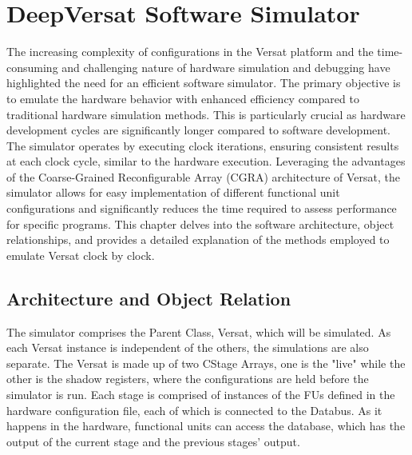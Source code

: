 \chapter{DeepVersat Software Simulator}
\label{chapter:Simulator}

The increasing complexity of configurations in the Versat platform and the time-consuming and challenging nature of hardware simulation and debugging have highlighted the need for an efficient software simulator. 
The primary objective is to emulate the hardware behavior with enhanced efficiency compared to traditional hardware simulation methods. 
This is particularly crucial as hardware development cycles are significantly longer compared to software development. 
The simulator operates by executing clock iterations, ensuring consistent results at each clock cycle, similar to the hardware execution. 
Leveraging the advantages of the Coarse-Grained Reconfigurable Array (CGRA) architecture of Versat, the simulator allows for easy implementation of different functional unit configurations and significantly reduces the time required to assess performance for specific programs. 
This chapter delves into the software architecture, object relationships, and provides a detailed explanation of the methods employed to emulate Versat clock by clock.




\section{Architecture and Object Relation}

The simulator comprises the Parent Class, Versat, which will be simulated. As each Versat instance is independent of the others, the simulations are also separate.
The Versat is made up of two CStage Arrays, one is the "live" while the other is the 
shadow registers, where the configurations are held before the simulator is run.
Each stage is comprised of instances of the FUs defined in the hardware configuration file, each of which is connected to the Databus.
As it happens in the hardware, functional units can access the database, which has the output 
of the current stage and the previous stages' output.
\clearpage

